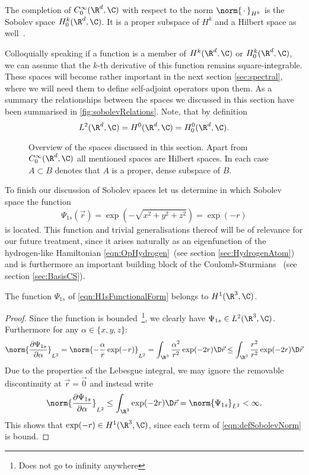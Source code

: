 \begin{defn}
	The completion of $C^\infty_0(\R^d, \C)$
	with respect to the norm $\norm{\slot}_{H^k}$
	is the Sobolev space $H^k_0(\R^d, \C)$.
	It is a proper subspace of $H^k$ and a Hilbert space as well~\cite{Adams2003}.
\end{defn}
Colloquially speaking if a function is a member of $H^k(\R^d, \C)$ or $H^k_0(\R^d, \C)$,
we can assume that the $k$-th derivative of this function remains square-integrable.
These spaces will become rather important in the next section \vref{sec:spectral},
where we will need them to define self-adjoint operators upon them.
As a summary the relationships between the spaces we discussed
in this section have been summarised in \fig \vref{fig:sobolevRelations}.
Note, that by definition
\[ L^2(\R^d, \C) = H^0(\R^d, \C) = H^0_0(\R^d, \C). \]

\begin{figure}
	\centering
	\caption{Overview of the spaces discussed in this section.
		Apart from $C^\infty_0(\R^d, \C)$ all mentioned spaces are Hilbert spaces.
		In each case $A \subset B$ denotes that $A$ is a proper, dense
		subspace of $B$.}
	\label{fig:sobolevRelations}
\end{figure}

To finish our discussion of Sobolev spaces let us determine
in which Sobolev space the function
\begin{equation}
	\label{eqn:H1sFunctionalForm}
	\Psi_{1s}(\vec{r}) = \exp\left(- \sqrt{x^2 + y^2 + z^2} \right) = \exp(-r)
\end{equation}
is located.
This function and trivial generalisations thereof
will be of relevance for our future treatment,
since it arises naturally as an eigenfunction of the hydrogen-like
Hamiltonian \eqref{eqn:OpHydrogen}~(see section \vref{sec:HydrogenAtom})
and is furthermore an important building block of the Coulomb-Sturmians%
~(see section \vref{sec:BasisCS}).

\begin{exmp}
	\label{exmp:H1sH1}
	The function $\Psi_{1s}$ of \eqref{eqn:H1sFunctionalForm} belongs to $H^1(\R^3, \C)$.
	\begin{proof}
	Since the function is bounded~\footnote{Does not go to infinity anywhere},
	we clearly have $\Psi_{1s} \in L^2(\R^3, \C)$.
	Furthermore for any $\alpha \in \{x, y, z\}$:
	\begin{equation}
		\norm{ \frac{\partial \Psi_{1s}}{\partial \alpha} }_{L^2}
		= \norm{ - \frac{\alpha}{r} \exp(-r) }_{L^2}
		= \int_{\R^3} \frac{\alpha^2}{r^2} \exp(-2r) \D\vec{r}
		\leq \int_{\R^3} \frac{r^2}{r^2} \exp(-2r) \D\vec{r}
		\label{eqn:ProofH1sH1}
	\end{equation}
	Due to the properties of the Lebesgue integral,
	we may ignore the removable discontinuity at $\vec{r} = \vec{0}$
	and instead write
	\[ \norm{ \frac{\partial \Psi_{1s}}{\partial \alpha} }_{L^2}
		\leq \int_{\R^3} \exp(-2r) \D\vec{r} = \norm{\Psi_{1s}}_{L^2} < \infty. \]
	This shows that $\exp(-r) \in H^1(\R^3, \C)$,
	since each term of \eqref{eqn:defSobolevNorm} is bound.
	\end{proof}
\end{exmp}

